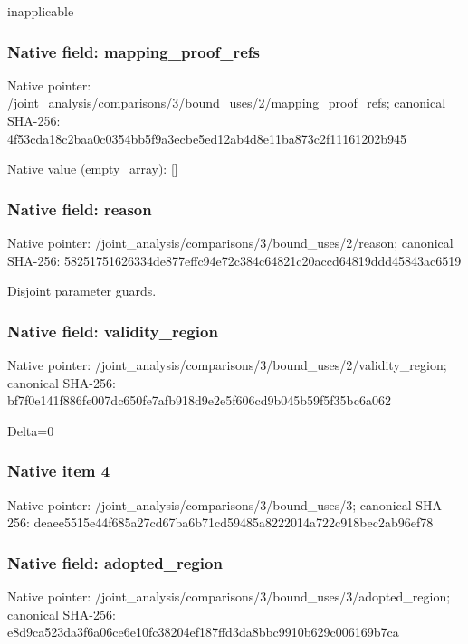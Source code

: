\documentclass[10pt,a4paper]{article}
\begin{document}
\begingroup\raggedright\sloppy inapplicable\par\endgroup

\subsubsection{Native field: mapping\_\allowbreak{}proof\_\allowbreak{}refs}
Native pointer: /joint\_\allowbreak{}analysis/comparisons/3/bound\_\allowbreak{}uses/2/mapping\_\allowbreak{}proof\_\allowbreak{}refs; canonical SHA-256: 4f53cda18c2baa0c0354bb5f9a3ecbe5ed12ab4d8e11ba873c2f11161202b945

Native value (empty\_\allowbreak{}array): []

\subsubsection{Native field: reason}
Native pointer: /joint\_\allowbreak{}analysis/comparisons/3/bound\_\allowbreak{}uses/2/reason; canonical SHA-256: 58251751626334de877effc94e72c384c64821c20accd64819ddd45843ac6519

\begingroup\raggedright\sloppy Disjoint parameter guards.\par\endgroup

\subsubsection{Native field: validity\_\allowbreak{}region}
Native pointer: /joint\_\allowbreak{}analysis/comparisons/3/bound\_\allowbreak{}uses/2/validity\_\allowbreak{}region; canonical SHA-256: bf7f0e141f886fe007dc650fe7afb918d9e2e5f606cd9b045b59f5f35bc6a062

\begingroup\raggedright\sloppy Delta=\allowbreak{}0\par\endgroup

\subsubsection{Native item 4}
Native pointer: /joint\_\allowbreak{}analysis/comparisons/3/bound\_\allowbreak{}uses/3; canonical SHA-256: deaee5515e44f685a27cd67ba6b71cd59485a8222014a722c918bec2ab96ef78

\subsubsection{Native field: adopted\_\allowbreak{}region}
Native pointer: /joint\_\allowbreak{}analysis/comparisons/3/bound\_\allowbreak{}uses/3/adopted\_\allowbreak{}region; canonical SHA-256: e8d9ca523da3f6a06ce6e10fc38204ef187ffd3da8bbc9910b629c006169b7ca
\end{document}

